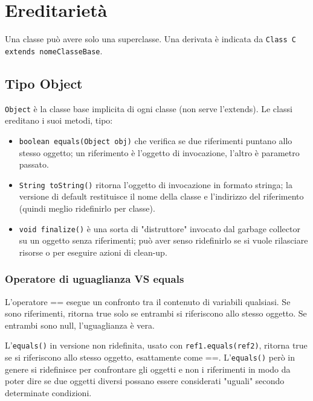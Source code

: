 
\chapter{Ereditarietà}

Una classe può avere solo una superclasse. Una derivata è indicata da \texttt{Class C extends nomeClasseBase{}}. 

\section{Tipo Object} %
\texttt{Object} è la classe base implicita di ogni classe (non serve l'extends). Le classi ereditano i suoi metodi, tipo:
\begin{itemize}
\item \texttt{boolean equals(Object obj)} che verifica se due riferimenti puntano allo stesso oggetto; un riferimento è l'oggetto di invocazione, l'altro è parametro passato. 
\item \texttt{String toString()} ritorna l'oggetto di invocazione in formato stringa; la versione di default restituisce il nome della classe e l'indirizzo del riferimento (quindi meglio ridefinirlo per classe).
\item \texttt{void finalize()} è una sorta di "distruttore" invocato dal garbage collector su un oggetto senza riferimenti; può aver senso ridefinirlo se si vuole rilasciare risorse o per eseguire azioni di clean-up.
\end{itemize}

\subsection{Operatore di uguaglianza VS equals} %
L'operatore == esegue un confronto tra il contenuto di variabili qualsiasi. Se sono riferimenti, ritorna true solo se entrambi si riferiscono allo stesso oggetto. Se entrambi sono null, l'uguaglianza è vera.

L'\texttt{equals()} in versione non ridefinita, usato con \texttt{ref1.equals(ref2)}, ritorna true se si riferiscono allo stesso oggetto, esattamente come ==. L'\texttt{equals()} però in genere si ridefinisce per confrontare gli oggetti e non i riferimenti in modo da poter dire se due oggetti diversi possano essere considerati "uguali" secondo determinate condizioni.


